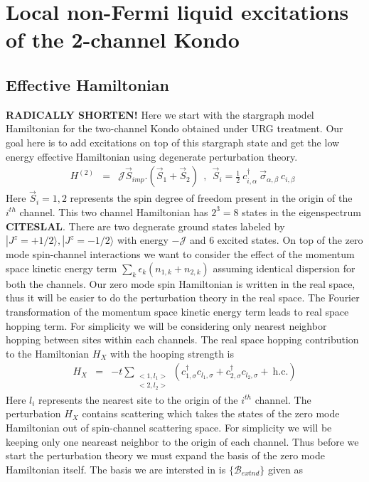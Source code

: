 \documentclass[reprint,prb,superscriptaddress]{revtex4-2}
\begin{document}
\section{Local non-Fermi liquid excitations of the 2-channel Kondo}
\subsection{Effective Hamiltonian}

\label{sec:eff_ham_2ch}
\textbf{RADICALLY SHORTEN!}
\noindent Here we start with the stargraph model Hamiltonian for the two-channel Kondo obtained under URG treatment. Our goal here is to add excitations on top of this stargraph state and get the low energy effective Hamiltonian using degenerate perturbation theory.
\begin{eqnarray}
H^{(2)}&=& {\mathcal{J}} \vec{S}_{imp}.(\vec{S}_1+\vec{S}_2)~~,~~\vec{S}_i =  \frac{1}{2}~ c_{i,\alpha}^{\dagger}~ \vec{\sigma}_{\alpha,\beta}~ c_{i,\beta}~~
\label{eq:channel-2-spin}
\end{eqnarray}
Here $\vec{S}_i=1,2$ represents the spin degree of freedom present in the origin of the $i^{th}$ channel. This two channel Hamiltonian has $2^3=8$ states in the eigenspectrum \textbf{CITE{SLAL}}. There are two degnerate ground states labeled by $|J^z=+1/2\rangle, |J^z=-1/2\rangle$ with energy $-\mathcal{J}$ and $6$ excited states.
On top of the zero mode spin-channel interactions we want to consider the effect of the momentum space kinetic energy term $\sum_{k}\epsilon_k (n_{1,k}+n_{2,k})$ assuming identical dispersion for both the channels. Our zero mode spin Hamiltonian is written in the real space, thus it will be easier to do the perturbation theory in the real space. The Fourier transformation of the momentum space kinetic energy  term leads to real space hopping term. For simplicity we will be considering only nearest neighbor hopping between sites within each channels. The real space hopping contribution to the Hamiltonian $H_X$ with the hooping strength is 
\begin{eqnarray}
H_{X} &=& -t \displaystyle\sum_{\substack{<1,l_1> \\ <2,l_2>}} (c^{\dagger}_{1,\sigma}c_{l_1,\sigma}+c^{\dagger}_{2,\sigma}c_{l_2,\sigma}+ ~\textrm{h.c.})
\end{eqnarray}
Here $l_i$ represents the nearest site to the origin of the $i^{th}$ channel. The perturbation $H_X$ contains scattering which takes the states of the zero mode Hamiltonian out of spin-channel scattering space. For simplicity we will be keeping only one neareast neighbor to the origin of each channel. Thus before we start the perturbation theory we must expand the basis of the zero mode Hamiltonian itself. The basis we are intersted in is $\{\mathcal{B}_{extnd}\}$ given as 
\end{document}
